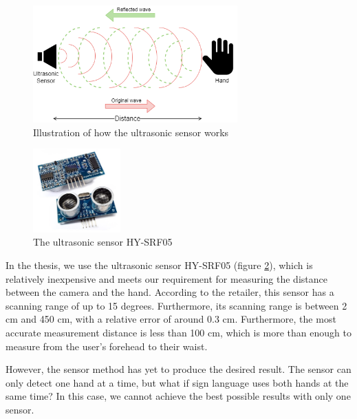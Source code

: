 \begin{figure}[H]
	\centering
	\includegraphics[width=0.7\textwidth]{img/Chap4/UltrasonicSensorFunction.png}
	\caption{Illustration of how the ultrasonic sensor works}
	\label{fig:Chap4-UltrasonicSensorFunction}
\end{figure}

\begin{figure}
  \begin{center}
  	\includegraphics[width=0.3\textwidth]{img/Chap4/UltrasonicSensor.jpeg}
  \end{center}
	\caption{The ultrasonic sensor HY-SRF05}
  \label{fig:Chap4-UltrasonicSensorHYSRF05}
\end{figure}

In the thesis, we use the ultrasonic sensor HY-SRF05 (figure \ref{fig:Chap4-UltrasonicSensorHYSRF05}), which is relatively inexpensive and meets our requirement for measuring the distance between the camera and the hand. According to the retailer, this sensor has a scanning range of up to 15 degrees. Furthermore, its scanning range is between 2 cm and 450 cm, with a relative error of around 0.3 cm. Furthermore, the most accurate measurement distance is less than 100 cm, which is more than enough to measure from the user's forehead to their waist.

However, the sensor method has yet to produce the desired result. The sensor can only detect one hand at a time, but what if sign language uses both hands at the same time? In this case, we cannot achieve the best possible results with only one sensor.

